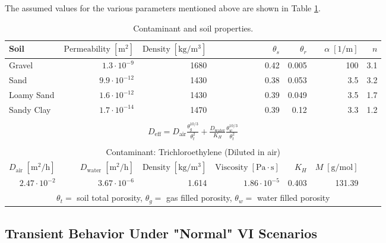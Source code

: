 \documentclass[journal=esthag,manuscript=suppinfo]{achemso}
\begin{document}
The assumed values for the various parameters mentioned above are shown in Table \ref{tbl:data}.
\begin{table}[!htb]
  \centering
  \caption{Contaminant and soil properties\cite{Abreu2012a,U.S.-Environmental-Protection-Agency2004a}.} \label{tbl:data}
  \begin{tabular}{l r r r r r r}
  \toprule
    Soil & $\text{Permeability} \; [\mathrm{m^2}]$  & $\mathrm{Density} \; [\mathrm{kg/m^3}]$  & $\theta_s$  & $\theta_r$  & $\alpha \; [\mathrm{1/m}]$  & $n$ \\
    \hline
    Gravel\cite{Dan2012a}     & $1.3 \cdot 10^{-9}$   & 1680    & 0.42        & 0.005       & 100       & 3.1 \\
    Sand          & $9.9 \cdot 10^{-12}$  & 1430    & 0.38        & 0.053       & 3.5       & 3.2 \\
    Loamy Sand    & $1.6 \cdot 10^{-12}$  & 1430    & 0.39        & 0.049       & 3.5       & 1.7 \\
    Sandy Clay    & $1.7 \cdot 10^{-14}$  & 1470    & 0.39        & 0.12        & 3.3       & 1.2 \\
                  &                       &         &             &             &           & \\
    \multicolumn{7}{c}{$D_\mathrm{eff} = D_\mathrm{air}\frac{\theta_g^{10/3}}{\theta_t^2} + \frac{D_\mathrm{water}}{K_H} \frac{\theta_w^{10/3}}{\theta_t^2}$} \\
                  &                       &         &             &             &           & \\
    \multicolumn{7}{c}{Contaminant: Trichloroethylene (Diluted in air)} \\
    \multicolumn{1}{r}{$D_\mathrm{air} \; [\mathrm{m^2/h}]$}  & $D_\mathrm{water} \; [\mathrm{m^2/h}]$  & $\mathrm{Density} \; [\mathrm{kg/m^3}]$ & $\mathrm{Viscosity} \; [\mathrm{Pa \cdot s}]$  & $K_H$ & $M \; [\mathrm{g/mol}]$ &  \\
    \hline
    \multicolumn{1}{r}{$2.47 \cdot 10^{-2}$}  & $3.67 \cdot 10^{-6}$  & 1.614 & $1.86 \cdot 10^{-5}$  & 0.403 & 131.39  &  \\
    \bottomrule
    \multicolumn{7}{c}{$\theta_t=$ soil total porosity, $\theta_g=$ gas filled porosity, $\theta_w=$ water filled porosity}
  \end{tabular}
\end{table}

\subsection{Transient Behavior Under "Normal" VI Scenarios}
\end{document}
